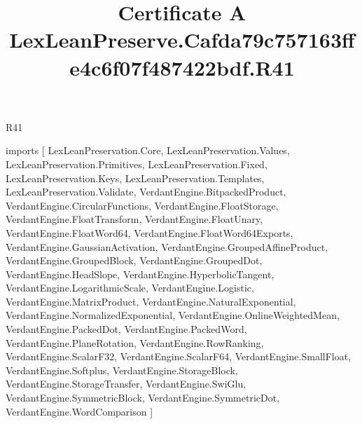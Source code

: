 \begin{lexlean}{R41}
\title{Certificate A LexLeanPreserve.Cafda79c757163ffe4c6f07f487422bdf.R41}
\begin{coremodule}
imports [
  LexLeanPreservation.Core,
  LexLeanPreservation.Values,
  LexLeanPreservation.Primitives,
  LexLeanPreservation.Fixed,
  LexLeanPreservation.Keys,
  LexLeanPreservation.Templates,
  LexLeanPreservation.Validate,
  VerdantEngine.BitpackedProduct,
  VerdantEngine.CircularFunctions,
  VerdantEngine.FloatStorage,
  VerdantEngine.FloatTransform,
  VerdantEngine.FloatUnary,
  VerdantEngine.FloatWord64,
  VerdantEngine.FloatWord64Exports,
  VerdantEngine.GaussianActivation,
  VerdantEngine.GroupedAffineProduct,
  VerdantEngine.GroupedBlock,
  VerdantEngine.GroupedDot,
  VerdantEngine.HeadSlope,
  VerdantEngine.HyperbolicTangent,
  VerdantEngine.LogarithmicScale,
  VerdantEngine.Logistic,
  VerdantEngine.MatrixProduct,
  VerdantEngine.NaturalExponential,
  VerdantEngine.NormalizedExponential,
  VerdantEngine.OnlineWeightedMean,
  VerdantEngine.PackedDot,
  VerdantEngine.PackedWord,
  VerdantEngine.PlaneRotation,
  VerdantEngine.RowRanking,
  VerdantEngine.ScalarF32,
  VerdantEngine.ScalarF64,
  VerdantEngine.SmallFloat,
  VerdantEngine.Softplus,
  VerdantEngine.StorageBlock,
  VerdantEngine.StorageTransfer,
  VerdantEngine.SwiGlu,
  VerdantEngine.SymmetricBlock,
  VerdantEngine.SymmetricDot,
  VerdantEngine.WordComparison
]


\end{coremodule}
\end{lexlean}
